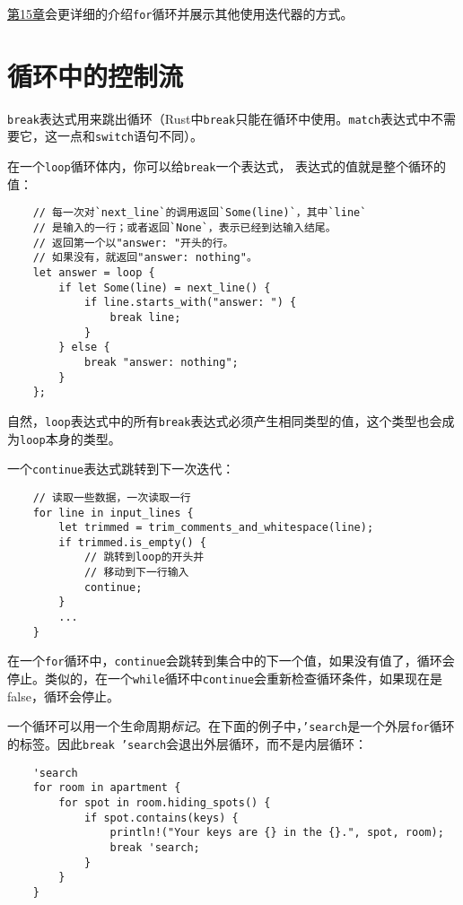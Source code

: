 \hyperref[ch15]{第15章}会更详细的介绍\texttt{for}循环并展示其他使用迭代器的方式。

\section{循环中的控制流}

\texttt{break}表达式用来跳出循环（Rust中\texttt{break}只能在循环中使用。\texttt{match}表达式中不需要它，这一点和\texttt{switch}语句不同）。

在一个\texttt{loop}循环体内，你可以给\texttt{break}一个表达式，
表达式的值就是整个循环的值：
\begin{verbatim}
    // 每一次对`next_line`的调用返回`Some(line)`，其中`line`
    // 是输入的一行；或者返回`None`，表示已经到达输入结尾。
    // 返回第一个以"answer: "开头的行。
    // 如果没有，就返回"answer: nothing"。
    let answer = loop {
        if let Some(line) = next_line() {
            if line.starts_with("answer: ") {
                break line;
            }
        } else {
            break "answer: nothing";
        }
    };
\end{verbatim}

自然，\texttt{loop}表达式中的所有\texttt{break}表达式必须产生相同类型的值，这个类型也会成为\texttt{loop}本身的类型。

一个\texttt{continue}表达式跳转到下一次迭代：
\begin{verbatim}
    // 读取一些数据，一次读取一行
    for line in input_lines {
        let trimmed = trim_comments_and_whitespace(line);
        if trimmed.is_empty() {
            // 跳转到loop的开头并
            // 移动到下一行输入
            continue;
        }
        ...
    }
\end{verbatim}

在一个\texttt{for}循环中，\texttt{continue}会跳转到集合中的下一个值，如果没有值了，循环会停止。类似的，在一个\texttt{while}循环中\texttt{continue}会重新检查循环条件，如果现在是false，循环会停止。

一个循环可以用一个生命周期\emph{标记}。在下面的例子中，\texttt{'search}是一个外层\texttt{for}循环的标签。因此\texttt{break 'search}会退出外层循环，而不是内层循环：
\begin{verbatim}
    'search
    for room in apartment {
        for spot in room.hiding_spots() {
            if spot.contains(keys) {
                println!("Your keys are {} in the {}.", spot, room);
                break 'search;
            }
        }
    }
\end{verbatim}

